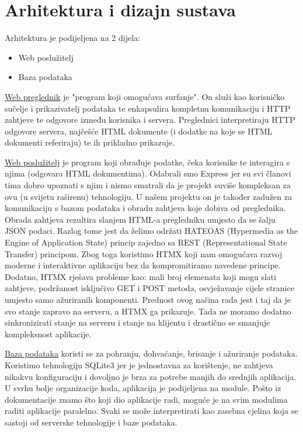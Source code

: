 \chapter{Arhitektura i dizajn sustava}

\noindent Arhitektura je podijeljena na 2 dijela:
\begin{itemize}
  \item Web poslužitelj
  \item Baza podataka
\end{itemize}

\underline{Web preglednik} je "program koji omogućava surfanje". On služi kao korisničko sučelje i prikazivatelj podataka te enkapsulira kompletnu komunikaciju i HTTP zahtjeve te odgovore između korisnika i servera. Preglednici interpretiraju HTTP odgovore servera, najčešće HTML dokumente (i dodatke na koje se HTML dokumenti referiraju) te ih prikladno prikazuje.\hfill \break

\underline{Web poslužitelj} je program koji obrađuje podatke, čeka korisnike te interagira s njima (odgovara HTML dokumentima). 
Odabrali smo Express jer su svi članovi tima dobro upoznati s njim i nismo smatrali da je projekt suviše kompleksan za ovu (u svijetu raširenu) tehnologiju. U našem projektu on je također zadužen za komunikaciju s bazom podataka i obradu zahtjeva koje dobiva od preglednika. Obrada zahtjeva rezultira slanjem HTML-a pregledniku umjesto da se šalju JSON podaci. Razlog tome jest da želimo održati HATEOAS (Hypermedia as the Engine of Application State) princip zajedno sa REST (Representational State Transfer) principom. Zbog toga koristimo HTMX koji nam omogućava razvoj moderne i interaktivne aplikaciju bez da kompromitiramo navedene principe. Dodatno, HTMX rješava probleme kao: mali broj elemenata koji mogu slati zahtjeve, podržanost isključivo GET i POST metoda, osvježavanje cijele stranice umjesto samo ažuriranih komponenti. Prednost ovog načina rada jest i taj da je svo stanje zapravo na serveru, a HTMX ga prikazuje. Tada ne moramo dodatno sinkronizirati stanje na serveru i stanje na klijentu i  drastično se smanjuje kompleksnost aplikacije.\hfill \break

\underline{Baza podataka} koristi se za pohranju, dohvaćanje, brisanje i ažuriranje podataka. Koristimo tehnologiju SQLite3 jer je jednostavna za korištenje, ne zahtjeva nikakvu konfiguraciju i dovoljno je brza za potrebe manjih do srednjih aplikacija.\hfill \break
\eject
U svrhu bolje organizacije koda, aplikacija je podijeljena na module. Pošto iz dokumentacije znamo što koji dio aplikacije radi, moguće je na svim modulima raditi aplikacije paralelno. Svaki se može interpretirati kao zasebna cjelina koja se sastoji od serverske tehnologije i baze podataka.\hfill \break

